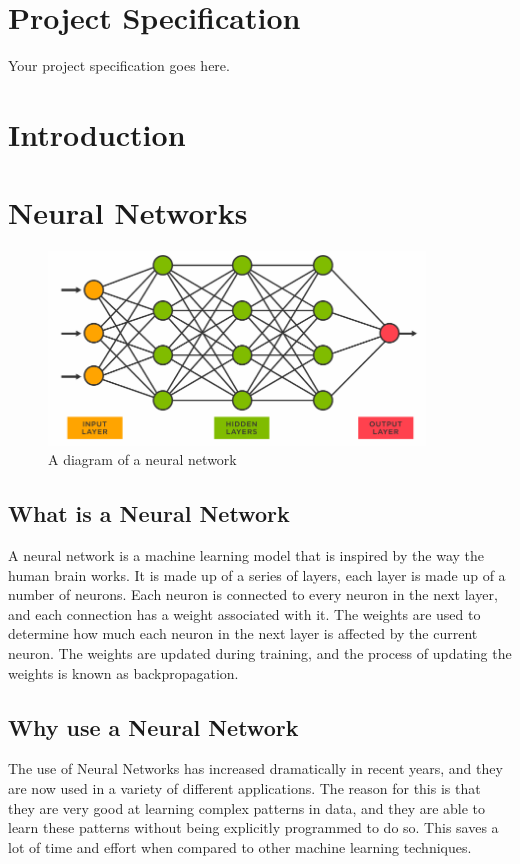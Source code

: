 \documentclass[]{final_report}
\begin{document}
\chapter*{Project Specification}
Your project specification goes here.

\chapter{Introduction}

\chapter{Neural Networks}
\begin{figure}[ht!]
  \centering
  \includegraphics[width=100mm]{images/NeuralNetwork.png}
  \caption{A diagram of a neural network \cite{NeuralNetworkDiagram}}
\end{figure}

\section{What is a Neural Network}
A neural network is a machine learning model that is inspired by the way the human brain works.
It is made up of a series of layers, each layer is made up of a number of neurons.
Each neuron is connected to every neuron in the next layer, and each connection has a weight associated with it.
The weights are used to determine how much each neuron in the next layer is affected by the current neuron.
The weights are updated during training, and the process of updating the weights is known as backpropagation.

\section{Why use a Neural Network}
The use of Neural Networks has increased dramatically in recent years, and they are now used in a variety of different applications.
The reason for this is that they are very good at learning complex patterns in data, and they are able to learn 
these patterns without being explicitly programmed to do so. This saves a lot of time and effort when compared to other machine learning techniques.
\end{document}

